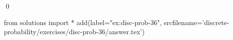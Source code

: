 
\begin{ex} 
  \label{ex:disc-prob-36}
  
  \qed
\end{ex} 
\begin{python0}
from solutions import *
add(label="ex:disc-prob-36",
    srcfilename='discrete-probability/exercises/disc-prob-36/answer.tex') 
\end{python0}
